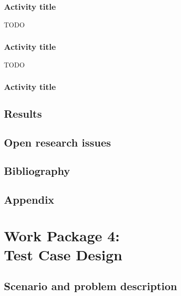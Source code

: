\documentclass[oneside]{book}
\begin{document}
\section{Activity title}
TODO
\section{Activity title}
TODO
\section{Activity title}


\chapter{Results}
\chapter{Open research issues}
\chapter{Bibliography}
\chapter{Appendix}

\setcounter{chapter}{0}

\part*{Work Package 4:\\Test Case Design}

\chapter{Scenario and problem description}
\end{document}

